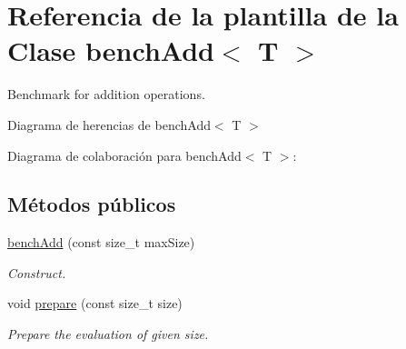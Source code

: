 \hypertarget{classbenchAdd}{}\section{Referencia de la plantilla de la Clase bench\+Add$<$ T $>$}
\label{classbenchAdd}


Benchmark for addition operations.  




Diagrama de herencias de bench\+Add$<$ T $>$


Diagrama de colaboración para bench\+Add$<$ T $>$\+:
\subsection*{Métodos públicos}
\begin{DoxyCompactItemize}
\item 
\hyperlink{classbenchAdd_a87c319715895c7741c5450232a80a54d}{bench\+Add} (const size\+\_\+t max\+Size)
\begin{DoxyCompactList}\small\item\em Construct. \end{DoxyCompactList}\item 
void \hyperlink{classbenchAdd_a42b0ce6b2d78a84bb89e135517f65d4a}{prepare} (const size\+\_\+t size)
\begin{DoxyCompactList}\small\item\em Prepare the evaluation of given size. \end{DoxyCompactList}\end{DoxyCompactItemize}
